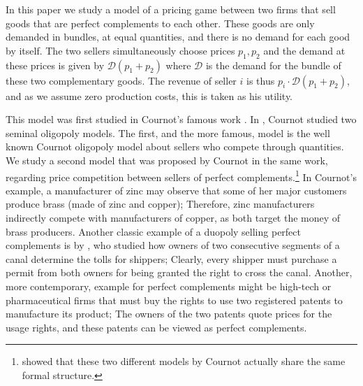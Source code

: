 

In this paper we study a model of a pricing game between two firms
that sell goods that are perfect complements to each other. These goods are only demanded in bundles, at equal quantities, and there is no demand for each good by itself.
The two sellers simultaneously choose prices $p_1, p_2$
and the demand at these prices is given by $\mathcal{D}(p_1+p_2)$ where
$\mathcal{D}$ is the demand for the bundle of these two complementary
goods. %
The revenue of seller $i$ is thus $p_i \cdot \mathcal{D}(p_1+p_2)$, and as
we assume zero production costs, this is taken as his utility.



This model was first studied in Cournot's famous work \cite{Cournot1838}.
In \cite{Cournot1838}, Cournot studied two seminal oligopoly models.
The first, and the more famous, model is the well known Cournot oligopoly model about
sellers who compete through quantities. We study a second model that was proposed by Cournot in the same work, regarding price competition between sellers of perfect complements.\footnote{
\cite{Son68} showed that these two different models by Cournot actually share the same formal structure.
}
In Cournot's example, a manufacturer of zinc may observe that some of her major customers produce brass (made of zinc and copper);
Therefore, zinc manufacturers
indirectly compete with manufacturers of copper, as both target the money of brass producers.
Another classic example of a duopoly selling perfect complements is by \cite{Ell39}, who studied how owners of two consecutive segments of a canal determine the tolls for shippers; Clearly, every shipper must purchase a permit from both owners for being granted the right to cross the canal.
Another, more contemporary, example for perfect complements might be
high-tech or pharmaceutical firms that must buy the rights to use two registered patents to manufacture its product;
The owners of the two patents quote prices for the usage rights, and these patents can be viewed as perfect complements. %

